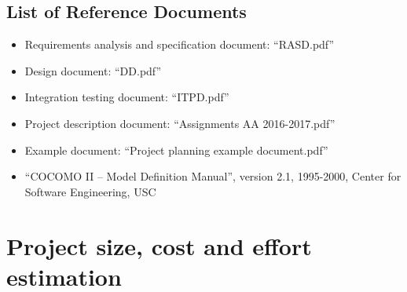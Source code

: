 \documentclass[english]{article}
\begin{document}

\subsection{List of Reference Documents}

\begin{itemize}
	\item{Requirements analysis and specification document: “RASD.pdf”}
	\item{Design document: “DD.pdf”}
	\item{Integration testing document: “ITPD.pdf”}
	\item{Project description document: “Assignments AA 2016-2017.pdf”}
	\item{Example document: “Project planning example document.pdf”}
	\item{“COCOMO II -- Model Definition Manual”, version 2.1, 1995-2000, Center for Software Engineering, USC}
\end{itemize}

\section{Project size, cost and effort estimation}

\end{document}
